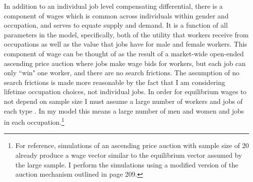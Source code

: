 \documentclass[11pt]{article}
\begin{document}
In addition to an individual job level compensating differential, there is a component of wages which is common across individuals within gender and occupation, and serves to equate supply and demand. It is a function of all parameters in the model, specifically, both of the utility that workers receive from occupations as well as the value that jobs have for male and female workers. This component of wage can be thought of as the result of a market-wide open-ended ascending price auction where jobs make wage bids for workers, but each job can only ``win" one worker, and there are no search frictions. The assumption of no search frictions is made more reasonable by the fact that I am considering lifetime occupation choices, not individual jobs. In order for equilibrium wages to not depend on sample size I must assume a large number of workers and jobs of each type \cite{Galichon2013b}. In my model this means a large number of men and women and jobs in each occupation.\footnote{For reference, simulations of an ascending price auction with sample size of 20 already produce a wage vector similar to the equilibrium vector assumed by the large sample. I perform the simulations using a modified version of the auction mechanism outlined in  page 209.}

 
 
 
 







\end{document}
